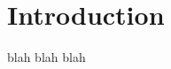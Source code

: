 \chapter{Introduction} %
\label{chap:introduction} %

\begin{comment} %
Tell them what you are going to tell them
\end{comment}

blah blah blah
